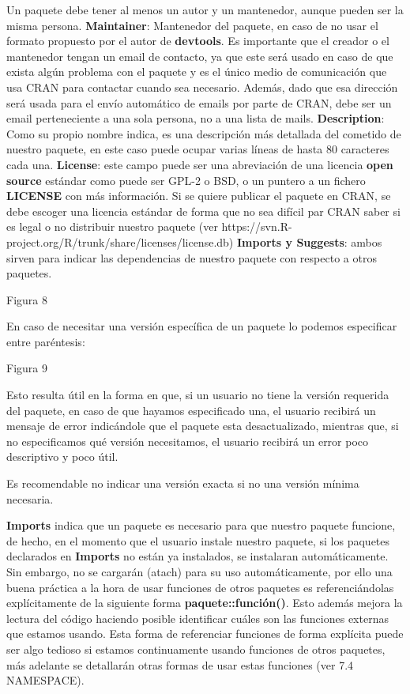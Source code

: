 Un paquete debe tener al menos un autor y un mantenedor, aunque pueden ser la misma
persona.
\textbf{Maintainer}: Mantenedor del paquete, en caso de no usar el formato propuesto por el autor
de \textbf{devtools}.
Es importante que el creador o el mantenedor tengan un email de contacto, ya que este ser\'a
usado en caso de que exista alg\'un problema con el paquete y es el \'unico medio de
comunicaci\'on que usa CRAN para contactar cuando sea necesario. Adem\'as, dado que esa
direcci\'on ser\'a usada para el env\'io autom\'atico de emails por parte de CRAN, debe ser un
email perteneciente a una sola persona, no a una lista de mails.
\textbf{Description}: Como su propio nombre indica, es una descripci\'on m\'as detallada del cometido
de nuestro paquete, en este caso puede ocupar varias l\'ineas de hasta 80 caracteres cada
una.
\textbf{License}: este campo puede ser una abreviaci\'on de una licencia \textbf{open source} est\'andar como
puede ser GPL-2 o BSD, o un puntero a un fichero \textbf{LICENSE} con m\'as informaci\'on.
Si se quiere publicar el paquete en CRAN, se debe escoger una licencia est\'andar de forma
que no sea dif\'icil par CRAN saber si es legal o no distribuir nuestro paquete (ver 
https://svn.R-project.org/R/trunk/share/licenses/license.db)
\textbf{Imports y Suggests}: ambos sirven para indicar las dependencias de nuestro paquete con
respecto a otros paquetes.

Figura 8

En caso de necesitar una versi\'on espec\'ifica de un paquete lo podemos especificar entre
par\'entesis:

Figura 9

Esto resulta \'util en la forma en que, si un usuario no tiene la versi\'on requerida del paquete,
en caso de que hayamos especificado una, el usuario recibir\'a un mensaje de error indic\'andole que el 
paquete esta desactualizado, mientras que, si no especificamos qu\'e versi\'on
necesitamos, el usuario recibir\'a un error poco descriptivo y poco \'util.

Es recomendable no indicar una versi\'on exacta si no una versi\'on m\'inima necesaria.

\textbf{Imports} indica que un paquete es necesario para que nuestro paquete funcione, de hecho,
en el momento que el usuario instale nuestro paquete, si los paquetes declarados en \textbf{Imports}
no est\'an ya instalados, se instalaran autom\'aticamente. Sin embargo, no se cargar\'an (atach)
para su uso autom\'aticamente, por ello una buena pr\'actica a la hora de usar funciones de
otros paquetes es referenci\'andolas expl\'icitamente de la siguiente forma \textbf{paquete::funci\'on()}.
Esto adem\'as mejora la lectura del c\'odigo haciendo posible identificar cu\'ales son las funciones
externas que estamos usando.
Esta forma de referenciar funciones de forma expl\'icita puede ser algo tedioso si estamos
continuamente usando funciones de otros paquetes, m\'as adelante se detallar\'an otras formas
de usar estas funciones (ver 7.4 NAMESPACE).

